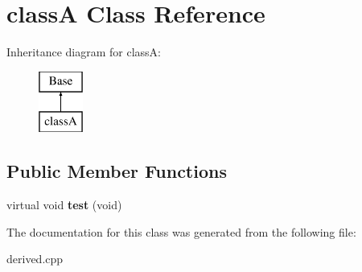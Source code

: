 \hypertarget{classclass_a}{\section{class\+A Class Reference}
\label{classclass_a}
}
Inheritance diagram for class\+A\+:\begin{figure}[H]
\begin{center}
\leavevmode
\includegraphics[height=2.000000cm]{classclass_a}
\end{center}
\end{figure}
\subsection*{Public Member Functions}
\begin{DoxyCompactItemize}
\item 
\hypertarget{classclass_a_a780bfb9bae70fdd102e852d6b89682ea}{virtual void {\bfseries test} (void)}\label{classclass_a_a780bfb9bae70fdd102e852d6b89682ea}

\end{DoxyCompactItemize}


The documentation for this class was generated from the following file\+:\begin{DoxyCompactItemize}
\item 
derived.\+cpp\end{DoxyCompactItemize}
